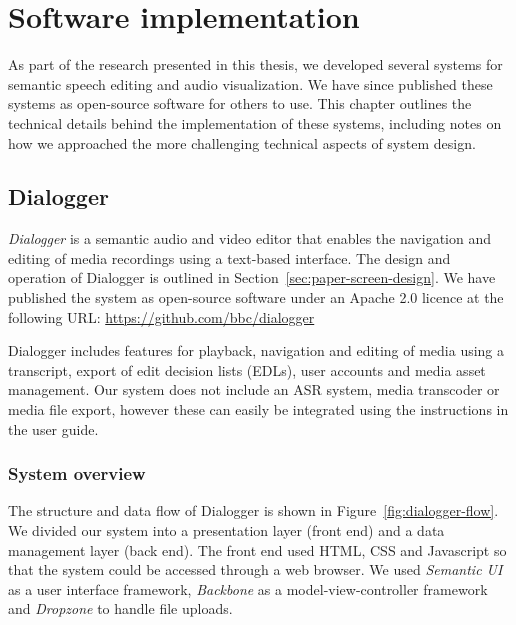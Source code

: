 \chapter{Software implementation}\label{app:tech}

As part of the research presented in this thesis, we developed several systems for semantic speech editing and audio
visualization. We have since published these systems as open-source software for others to use. This chapter outlines
the technical details behind the implementation of these systems, including notes on how we approached the more
challenging technical aspects of system design.

\section{Dialogger}\label{sec:dialogger}

\textit{Dialogger} is a semantic audio and video editor that enables the navigation and editing of media recordings using a
text-based interface. The design and operation of Dialogger is outlined in Section~\ref{sec:paper-screen-design}. We
have published the system as open-source software under an Apache 2.0 licence at the following URL:
\url{https://github.com/bbc/dialogger}



Dialogger includes features for playback, navigation and editing of media using a transcript, export of edit
decision lists (EDLs), user accounts and media asset management. Our system does not include an ASR system, media
transcoder or media file export, however these can easily be integrated using the instructions in the user guide.

\subsection{System overview}

The structure and data flow of Dialogger is shown in Figure~\ref{fig:dialogger-flow}. We divided our system into a
presentation layer (front end) and a data management layer (back end). The front end used HTML, CSS and Javascript so
that the system could be accessed through a web browser.  We used \textit{Semantic UI} as a user interface framework,
\textit{Backbone} as a model-view-controller framework and \textit{Dropzone} to handle file uploads.

